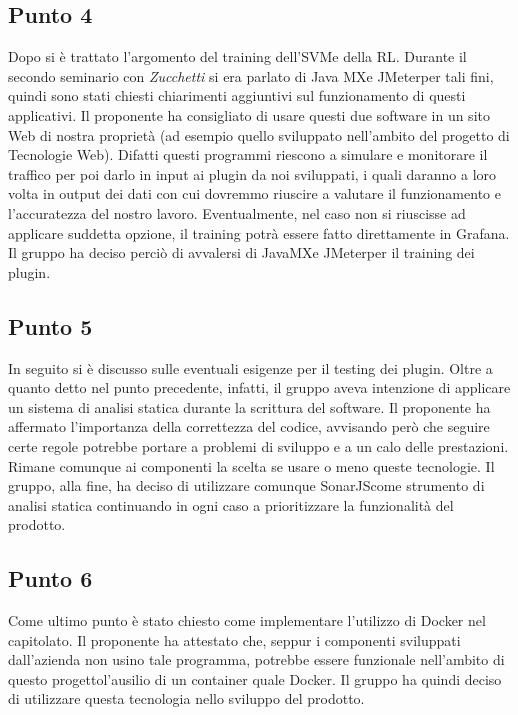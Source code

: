        \subsection{Punto 4}
            Dopo si è trattato l'argomento del training dell'SVM\glosp e della RL\glo. Durante il secondo seminario con \textit{Zucchetti} si era parlato di Java MX\glosp e JMeter\glosp per tali fini, quindi sono stati chiesti chiarimenti aggiuntivi sul funzionamento di questi applicativi. Il proponente ha consigliato di usare questi due software in un sito Web di nostra proprietà (ad esempio quello sviluppato nell'ambito del progetto di Tecnologie Web). Difatti questi programmi riescono a simulare e monitorare il traffico per poi darlo in input ai plugin da noi sviluppati, i quali daranno a loro volta in output dei dati con cui dovremmo riuscire a valutare il funzionamento e l'accuratezza del nostro lavoro. Eventualmente, nel caso non si riuscisse ad applicare suddetta opzione, il training potrà essere fatto direttamente in Grafana\glo. Il gruppo ha deciso perciò di avvalersi di JavaMX\glosp e JMeter\glosp per il training dei plugin.
        \subsection{Punto 5}
            In seguito si è discusso sulle eventuali esigenze per il testing dei plugin. Oltre a quanto detto nel punto precedente, infatti, il gruppo aveva intenzione di applicare un sistema di analisi statica durante la scrittura del software. Il proponente ha affermato l'importanza della correttezza del codice, avvisando però che seguire certe regole potrebbe portare a problemi di sviluppo e a un calo delle prestazioni. Rimane comunque ai componenti la scelta se usare o meno queste tecnologie. Il gruppo, alla fine, ha deciso di utilizzare comunque SonarJS\glosp come strumento di analisi statica continuando in ogni caso a prioritizzare la funzionalità del prodotto\glo.
        \subsection{Punto 6}
            Come ultimo punto è stato chiesto come implementare l'utilizzo di Docker nel capitolato\glo. Il proponente ha attestato che, seppur i componenti sviluppati dall'azienda non usino tale programma, potrebbe essere funzionale nell'ambito di questo progetto\glosp l'ausilio di un container quale Docker. Il gruppo ha quindi deciso di utilizzare questa tecnologia nello sviluppo del prodotto\glo.
